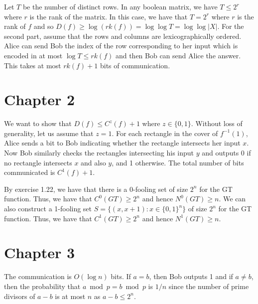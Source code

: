 \documentclass{article} %
\newenvironment{exercise}[2][Exercise]{\begin{trivlist}
\item[\hskip \labelsep {\bfseries #1}\hskip \labelsep {\bfseries #2.}]}{\end{trivlist}}
\begin{document}
    \begin{exercise}{1.31} Let $T$ be the number of distinct rows. In any boolean matrix, we have $T \leq 2^r$ where $r$ is the rank of the matrix. In this case, we have that $T = 2^r$ where $r$ is the rank of $f$ and so $D(f) \geq \log (rk(f)) = \log \log T = \log \log |X|$. For the second part, assume that the rows and columns are lexicographically ordered. Alice can send Bob the index of the row corresponding to her input which is encoded in at most $\log T \leq rk(f)$ and then Bob can send Alice the answer. This takes at most $rk(f) + 1$ bits of communication. 
        
    \end{exercise}

    \section{Chapter 2}
    \begin{exercise}{2.6}
        We want to show that $D(f) \leq C^z(f) +1$ where $z \in \{0,1\}$. Without loss of generality, let us assume that $z = 1$. For each rectangle in the cover of $f^{-1}(1)$, Alice sends a bit to Bob indicating whether the rectangle intersects her input $x$. Now Bob similarly checks the rectangles intersecting his input $y$ and outputs 0 if no rectangle intersects $x$ and also $y$, and 1 otherwise. The total number of bits communicated is $C^1(f) + 1$.
    \end{exercise}
    \begin{exercise}{2.7}
        By exercise 1.22, we have that there is a $0$-fooling set of size $2^n$ for the GT function. Thus, we have that $C^0(GT) \geq 2^n$ and hence $N^0(GT) \geq n$. We can also construct a 1-fooling set $S = \{(x, x+1): x\in\{0,1\}^n\}$ of size $2^n$ for the GT function. Thus, we have that $C^1(GT) \geq 2^n$ and hence $N^1(GT) \geq n$.
    \end{exercise}

    \begin{exercise}{2.21}

    \end{exercise}

    \begin{exercise}{2.22}
        
    \end{exercise}

    \begin{exercise}{2.23}
        
    \end{exercise}

    \section{Chapter 3}
    \begin{exercise}{3.6}
        The communication is $O(\log n)$ bits. If $a = b$, then Bob outputs 1 and if $a \neq b$, then the probability that $a \bmod p = b \bmod p$ is $1/n$ since the number of prime divisors of $a - b$ is at most $n$ as $a - b \leq 2^n$. 
    \end{exercise}
\end{document}
